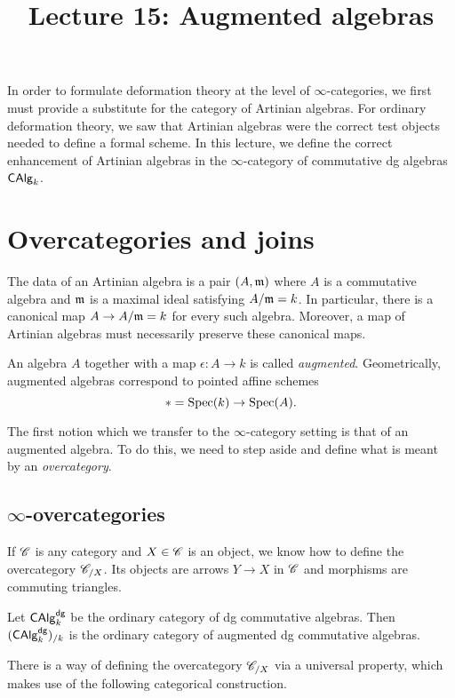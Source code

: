 \documentclass[11pt]{amsart}
\title{Lecture 15: Augmented algebras}
\def\Spec{{\rm Spec}}
\begin{document}
\maketitle

In order to formulate deformation theory at the level of $\infty$-categories, we first must provide a substitute for the category of Artinian algebras. 
For ordinary deformation theory, we saw that Artinian algebras were the correct test objects needed to define a formal scheme. 
In this lecture, we define the correct enhancement of Artinian algebras in the  $\infty$-category of commutative dg algebras ${\sf CAlg}_k$. 

\section{Overcategories and joins}

The data of an Artinian algebra is a pair $(A, {\mathfrak m})$ where $A$ is a commutative algebra and ${\mathfrak m}$ is a maximal ideal satisfying $A / {\mathfrak m} = k$. 
In particular, there is a canonical map $A \to A / {\mathfrak m} = k$ for every such algebra. 
Moreover, a map of Artinian algebras must necessarily preserve these canonical maps. 

An algebra $A$ together with a map $\epsilon : A \to k$ is called {\em augmented}. 
Geometrically, augmented algebras correspond to pointed affine schemes
\[
* = \Spec(k) \to \Spec(A) .
\]

The first notion which we transfer to the $\infty$-category setting is that of an augmented algebra. 
To do this, we need to step aside and define what is meant by an {\em overcategory}. 

\subsection{$\infty$-overcategories}

If $\mathscr C$ is any category and $X \in \mathscr C$ is an object, we know how to define the overcategory $\mathscr C_{/X}$. 
Its objects are arrows $Y \to X$ in $\mathscr C$ and morphisms are commuting triangles. 

\begin{eg}
Let ${\sf CAlg}^{\sf dg}_k$ be the ordinary category of dg commutative algebras. 
Then $({\sf CAlg}^{\sf dg}_k)_{/ k}$ is the ordinary category of augmented dg commutative algebras. 
\end{eg}

There is a way of defining the overcategory $\mathscr C_{/X}$ via a universal property, which makes use of the following categorical construction. 
\end{document}
